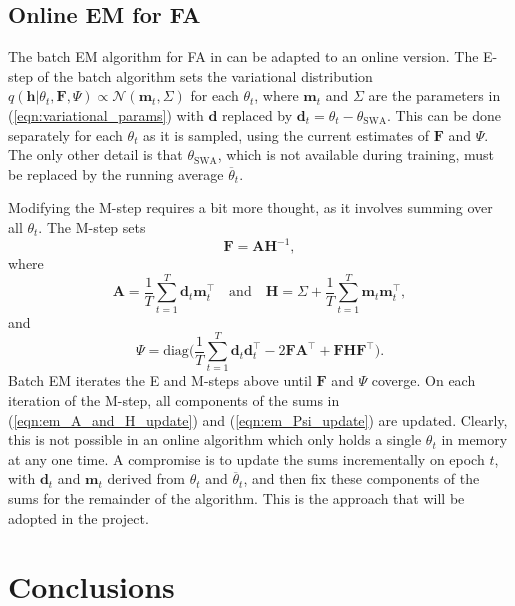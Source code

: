 \documentclass[msc,deptreport.inf]{infthesis} %
\newcommand{\matr}[1]{\mathbf{#1}}
\begin{document}
\section{Online EM for FA}

The batch EM algorithm for FA in \cite{barber2007} can be adapted to an online version. The E-step of the batch algorithm sets the variational distribution $q(\matr{h} | \theta_t, \matr{F}, \Psi) \propto \mathcal{N}(\matr{m}_t, \Sigma)$ for each $\theta_t$, where $\matr{m}_t$ and $\Sigma$ are the parameters in (\ref{eqn:variational_params}) with $\matr{d}$ replaced by $\matr{d}_t = \theta_t - \theta_{\text{SWA}}$. This can be done separately for each $\theta_t$ as it is sampled, using the current estimates of $\matr{F}$ and $\Psi$. The only other detail is that $\theta_{\text{SWA}}$, which is not available during training, must be replaced by the running average $\overline{\theta}_t$.

Modifying the M-step requires a bit more thought, as it involves summing over all $\theta_t$. The M-step sets
\begin{equation}
	\matr{F} = \matr{A}\matr{H}^{-1},
\end{equation}
where
\begin{equation}\label{eqn:em_A_and_H_update}
	\matr{A} = \frac{1}{T} \sum_{t=1}^T \matr{d}_t \matr{m}_t^\intercal \quad \text{and} \quad 
	\matr{H} = \Sigma + \frac{1}{T} \sum_{t=1}^T \matr{m}_t \matr{m}_t^\intercal,
\end{equation}
and
\begin{equation}\label{eqn:em_Psi_update}
	\Psi = \text{diag}\Bigg( \frac{1}{T} \sum_{t=1}^T \matr{d}_t \matr{d}_t^\intercal - 2\matr{FA}^\intercal + \matr{FHF}^\intercal \Bigg).
\end{equation}
Batch EM iterates the E and M-steps above until $\matr{F}$ and $\Psi$ coverge. On each iteration of the M-step, all components of the sums in (\ref{eqn:em_A_and_H_update}) and (\ref{eqn:em_Psi_update}) are updated. Clearly, this is not possible in an online algorithm which only holds a single $\theta_t$ in memory at any one time. A compromise is to update the sums incrementally on epoch $t$, with $\matr{d}_t$ and $\matr{m}_t$ derived from $\theta_t$ and $\overline{\theta}_t$, and then fix these components of the sums for the remainder of the algorithm. This is the approach that will be adopted in the project. 




\chapter{Conclusions}
\end{document}
